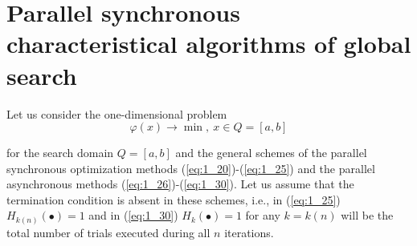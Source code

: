 \section{Parallel synchronous characteristical algorithms of global search}
\label{sec:3_1}
Let us consider the one-dimensional problem 
\begin{equation}
\label{eq:3_1}
\varphi(x)\rightarrow \min,\ x\in Q=[a,b]
\end{equation}

for the search domain  $Q=[a,b]$ and the general schemes of the parallel synchronous optimization methods (\ref{eq:1_20})-(\ref{eq:1_25}) and the parallel asynchronous methods (\ref{eq:1_26})-(\ref{eq:1_30}). Let us assume that the termination condition is absent in these schemes, i.e., in (\ref{eq:1_25}) $H_{k(n)}(\bullet) = 1$ and in (\ref{eq:1_30}) $H_{k}(\bullet)=1$ for any $k=k(n)$ will be the total number of trials executed during all $n$ iterations.

